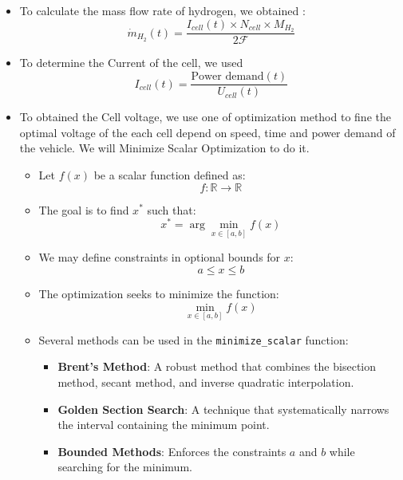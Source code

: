 \documentclass[12pt,a4paper]{article}
\numberwithin{equation}{section}
\begin{document}
{\begin{itemize}
	\item To calculate the mass flow rate of hydrogen, we obtained :
	\begin{equation}
		\dot{m}_{H_2}(t) = \frac{I_{cell}(t)\times N_{cell}\times M_{H_2}}{2\mathscr{F}}
	\end{equation}
	\item To determine the Current of the cell, we used
	\begin{equation}
		I_{cell}(t) = \frac{\text{Power demand} (t)}{U_{cell}(t)}
	\end{equation}
	\item To obtained the Cell voltage, we use one of optimization method to fine the optimal voltage of the each cell depend on speed, time and power demand of the vehicle. We will Minimize Scalar Optimization to do it.
\begin{itemize}
	\item Let \( f(x) \) be a scalar function defined as:
	\begin{equation}
		f: \mathbb{R} \to \mathbb{R}
	\end{equation}
	
	\item The goal is to find \( x^* \) such that:
	\begin{equation}
		x^* = \arg \min_{x \in [a, b]} f(x)
	\end{equation}
	
	\item We may define constraints in optional bounds for \( x \):
	\begin{equation}
		a \leq x \leq b
	\end{equation}
	
	\item The optimization seeks to minimize the function:
	\begin{equation}
		\min_{x \in [a, b]} f(x)
	\end{equation}
	
	\item Several methods can be used in the \texttt{minimize\_scalar} function:
	\begin{itemize}		
		\item \textbf{Brent's Method}: A robust method that combines the bisection method, secant method, and inverse quadratic interpolation.
		\item \textbf{Golden Section Search}: A technique that systematically narrows the interval containing the minimum point.
		\item \textbf{Bounded Methods}: Enforces the constraints \( a \) and \( b \) while searching for the minimum.
	\end{itemize}
	

\end{itemize}
\end{itemize}}
\end{document}
